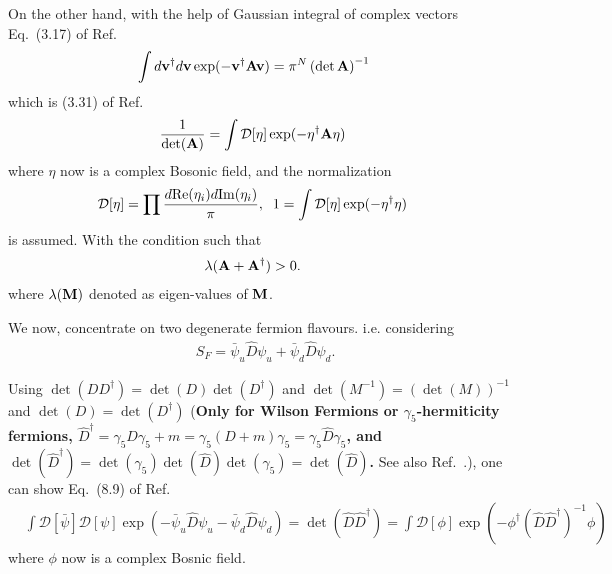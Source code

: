 On the other hand, with the help of Gaussian integral of complex vectors Eq.~(3.17) of Ref.~\cite{condensedmatterbookAltland}
\begin{equation}
\begin{split}
&\int d{\bf v}^{\dagger}d{\bf v} \exp (-{\bf v}^{\dagger} {\bf A} {\bf v})=\pi ^N \left(\det {\bf A}\right)^{-1}
\end{split}
\end{equation}
which is (3.31) of Ref.~\cite{latticeqcdbook2017}
\begin{equation}
\begin{split}
&\frac{1}{ \det ({\bf A}) }=\int \mathcal{D}[\eta] \exp (-\eta^{\dagger} {\bf A} \eta)
\end{split}
\end{equation}
where $\eta$ now is a complex Bosonic field, and the normalization
\begin{equation}
\begin{split}
&\mathcal{D}[\eta] = \prod \frac{d{\rm Re}(\eta _i)d{\rm Im}(\eta _i)}{\pi},\;\;1=\int \mathcal{D}[\eta] \exp (-\eta^{\dagger} \eta)
\end{split}
\end{equation}
is assumed. With the condition such that
\begin{equation}
\begin{split}
&\lambda ({\bf A}+{\bf A}^{\dagger}) > 0.
\end{split}
\end{equation}
where $\lambda ({\bf M})$ denoted as eigen-values of ${\bf M}$.

We now, concentrate on two degenerate fermion flavours. i.e. considering
\begin{equation}
\begin{split}
&S_F=\bar{\psi}_u \hat{D} \psi _u+\bar{\psi}_d \hat{D} \psi _d.
\end{split}
\end{equation}

Using $\det (DD^{\dagger})=\det (D)\det (D^{\dagger})$ and $\det(M^{-1})=\left(\det (M)\right)^{-1}$ and \textcolor[rgb]{1,0,0}{$\det (D)=\det (D^{\dagger})$} (\textbf{Only for Wilson Fermions or $\gamma _5$-hermiticity fermions, $\hat{D}^{\dagger}=\gamma _5 D \gamma _5 + m=\gamma _5 (D+m) \gamma _5=\gamma _5 \hat{D} \gamma _5$, and $\det(\hat{D}^{\dagger})=\det(\gamma _5)\det(\hat{D})\det(\gamma _5)=\det (\hat{D})$.} See also Ref.~\cite{weingarten1981}.), one can show Eq.~(8.9) of Ref.~\cite{latticeqcdbook2010}
\begin{equation}
\begin{split}
&\int \mathcal{D}[\bar{\psi}]\mathcal{D}[\psi]\exp\left(-\bar{\psi}_u \hat{D} \psi _u-\bar{\psi}_d \hat{D} \psi _d\right)=\det (\hat{D}\hat{D}^{\dagger})=\int \mathcal{D}[\phi] \exp (-\phi ^{\dagger}\left(\hat{D}\hat{D}^{\dagger}\right)^{-1} \phi)
\end{split}
\end{equation}
where $\phi$ now is a complex Bosnic field.

